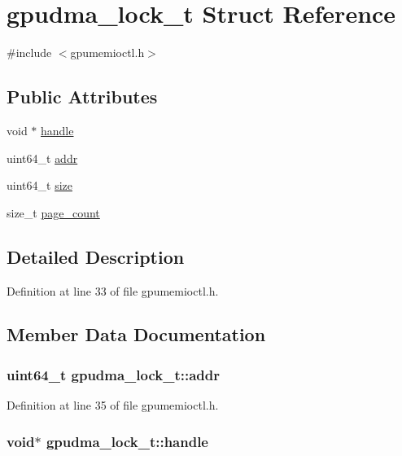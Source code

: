 \hypertarget{structgpudma__lock__t}{
\section{gpudma\_\-lock\_\-t Struct Reference}
\label{structgpudma__lock__t}
}


{\ttfamily \#include $<$gpumemioctl.h$>$}\subsection*{Public Attributes}
\begin{DoxyCompactItemize}
\item 
void $\ast$ \hyperlink{structgpudma__lock__t_a759be71a976110412ebf1384131930ae}{handle}
\item 
uint64\_\-t \hyperlink{structgpudma__lock__t_a3bcf1355c5cf552d0eedbae3f829f83d}{addr}
\item 
uint64\_\-t \hyperlink{structgpudma__lock__t_a7c3c9d36171da51b60208422084474a7}{size}
\item 
size\_\-t \hyperlink{structgpudma__lock__t_a7a5449281d51204ac90b1b6803004784}{page\_\-count}
\end{DoxyCompactItemize}


\subsection{Detailed Description}


Definition at line 33 of file gpumemioctl.h.

\subsection{Member Data Documentation}
\hypertarget{structgpudma__lock__t_a3bcf1355c5cf552d0eedbae3f829f83d}{
\subsubsection[{addr}]{\setlength{\rightskip}{0pt plus 5cm}uint64\_\-t {\bf gpudma\_\-lock\_\-t::addr}}}
\label{structgpudma__lock__t_a3bcf1355c5cf552d0eedbae3f829f83d}


Definition at line 35 of file gpumemioctl.h.\hypertarget{structgpudma__lock__t_a759be71a976110412ebf1384131930ae}{
\subsubsection[{handle}]{\setlength{\rightskip}{0pt plus 5cm}void$\ast$ {\bf gpudma\_\-lock\_\-t::handle}}}
\label{structgpudma__lock__t_a759be71a976110412ebf1384131930ae}


